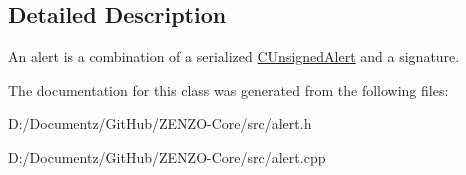 \subsection{Detailed Description}
An alert is a combination of a serialized \mbox{\hyperlink{class_c_unsigned_alert}{C\+Unsigned\+Alert}} and a signature. 

The documentation for this class was generated from the following files\+:\begin{DoxyCompactItemize}
\item 
D\+:/\+Documentz/\+Git\+Hub/\+Z\+E\+N\+Z\+O-\/\+Core/src/alert.\+h\item 
D\+:/\+Documentz/\+Git\+Hub/\+Z\+E\+N\+Z\+O-\/\+Core/src/alert.\+cpp\end{DoxyCompactItemize}
